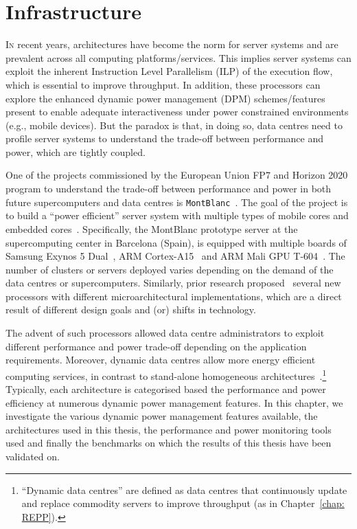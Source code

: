 \chapter{Infrastructure}
\label{chap: infrastructure}

 \lettrine{I}{n} recent years, \muc architectures have
become the norm for server systems and are prevalent across all computing
platforms/services.  This implies server systems can exploit the inherent Instruction
Level Parallelism (ILP) of the execution flow, which is essential to improve throughput.
In addition, these processors can explore the enhanced dynamic power management (DPM)
schemes/features present to enable adequate interactiveness under power constrained
environments (e.g., mobile devices). But the paradox is that, in doing so, data centres
need to profile server systems to understand the trade-off between performance and power,
which are tightly coupled.



 One of the projects commissioned by the European Union FP7 and Horizon 2020
program to understand the trade-off between performance and power in both future
supercomputers and data centres is \texttt{MontBlanc}~\citep{montblanc, montblanc2,
montblancbull}.  The goal of the project is to build a ``power efficient'' server system
with multiple types of mobile cores and embedded cores~\citep{armscale}.  Specifically,
the MontBlanc prototype server at the supercomputing center in Barcelona (Spain), is
equipped with multiple boards of Samsung Exynos 5 Dual~\citep{samsung}, ARM Cortex-A15~\citep{A15}
and ARM Mali GPU T-604~\citep{Mali}. The number of clusters or servers deployed varies
depending on the demand of the data centres or supercomputers. Similarly, prior research
proposed~\citep{Halpern2016MobileSatisfaction, Wong2012KnightShift:Heterogeneity,
Chitlur2012QuickIA:Prototypes,Guevara2013NavigatingMechanisms,Mars2011HeterogeneityOpportunity,
Cong2012Energy-efficientArchitectures,DBLP:journals/ppl/VillebonnetCLPS15} several new
processors with different microarchitectural implementations, which are a direct result of
different design goals and (or) shifts in technology.

The advent of such processors allowed data centre administrators to exploit different
performance and power trade-off depending on the application requirements.  Moreover,
dynamic data centres allow more energy efficient computing services, in contrast to
stand-alone homogeneous
architectures~\citep{Mars2011HeterogeneityOpportunity}.\footnote{``Dynamic data centres''
are defined as data centres that continuously update and replace commodity servers to
improve throughput (as in Chapter~\ref{chap: REPP}).} Typically, each architecture is
categorised based the performance and power efficiency at numerous dynamic power
management features.  In this chapter, we investigate the various dynamic power management
features available, the architectures used in this thesis, the performance and power
monitoring tools used and finally the benchmarks on which the results of this thesis have
been validated on. 


